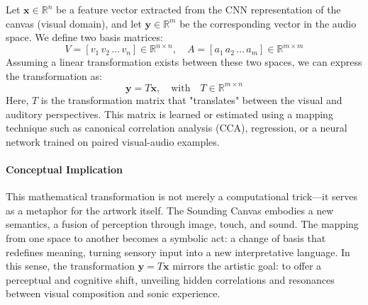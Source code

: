 \documentclass{article}
\begin{document}
Let $\mathbf{x} \in \mathbb{R}^n$ be a feature vector extracted from the CNN representation of the canvas (visual domain), and let $\mathbf{y} \in \mathbb{R}^m$ be the corresponding vector in the audio space. \newline 
We define two basis matrices:
\[
V = [v_1 \, v_2 \, \ldots \, v_n] \in \mathbb{R}^{n \times n}, \quad A = [a_1 \, a_2 \, \ldots \, a_m] \in \mathbb{R}^{m \times m}
\]
Assuming a linear transformation exists between these two spaces, we can express the transformation as:
\[
\mathbf{y} = T \mathbf{x}, \quad \text{with} \quad T \in \mathbb{R}^{m \times n}
\]
\noindent
Here, $T$ is the transformation matrix that "translates" between the visual and auditory perspectives. This matrix is learned or estimated using a mapping technique such as canonical correlation analysis (CCA), regression, or a neural network trained on paired visual-audio examples.

\paragraph{Conceptual Implication}

This mathematical transformation is not merely a computational trick—it serves as a metaphor for the artwork itself. The Sounding Canvas embodies a new semantics, a fusion of perception through image, touch, and sound. The mapping from one space to another becomes a symbolic act: a change of basis that redefines meaning, turning sensory input into a new interpretative language. \newline
In this sense, the transformation $\mathbf{y} = T \mathbf{x}$ mirrors the artistic goal: to offer a perceptual and cognitive shift, unveiling hidden correlations and resonances between visual composition and sonic experience.
\end{document}
